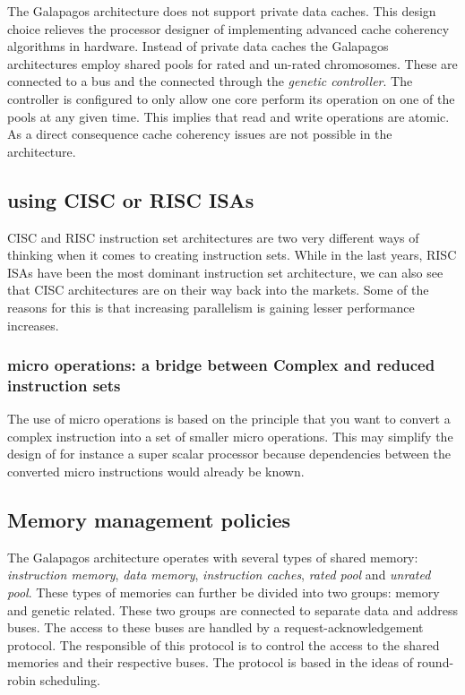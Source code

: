 The Galapagos architecture does not support private data caches. This design choice relieves the processor designer of implementing advanced cache coherency algorithms in hardware. Instead of private data caches the Galapagos architectures employ shared pools for rated and un-rated chromosomes. These are connected to a bus and the connected through the \emph{genetic controller}. The controller is configured to only allow one core perform its operation on one of the pools at any given time. This implies that read and write operations are atomic. As a direct consequence cache coherency issues are not possible in the architecture. 




\subsection{using CISC or RISC ISAs}
CISC and RISC instruction set architectures are two very different ways of thinking when it comes to creating instruction sets.
While in the last years, RISC ISAs have been the most dominant instruction set architecture, we can also see that CISC architectures
are on their way back into the markets. Some of the reasons for this is that increasing parallelism is gaining lesser performance increases.

\subsubsection{micro operations: a bridge between Complex and reduced instruction sets}
The use of micro operations is based on the principle that you want to convert a complex instruction into a set of smaller micro operations. This
may simplify the design of for instance a super scalar processor because dependencies between the converted micro instructions would already be known. 

\subsection{Memory management policies}

The Galapagos architecture operates with several types of shared memory: \emph{instruction memory}, \emph{data memory}, \emph{instruction caches}, \emph{rated pool} and \emph{unrated pool}. These types of memories  can further be divided into two groups: memory and genetic related. These two groups are connected to separate data and address buses. The access to these buses are handled by a request-acknowledgement protocol. The responsible of this protocol is to control the access to the shared memories and their respective buses. The protocol is based in the ideas of round-robin scheduling. 

